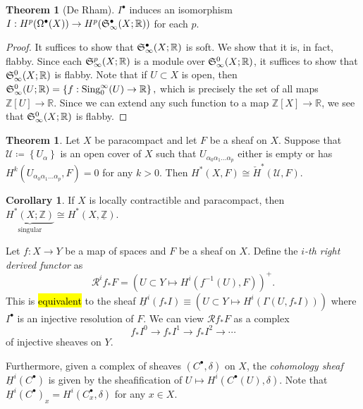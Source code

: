 \documentclass[10pt,letterpaper,cm]{nupset}
\theoremstyle{definition}
\theoremstyle{theorem}
\newtheorem{theorem}[definition]{Theorem}
\newtheorem{corollary}[definition]{Corollary}
\theoremstyle{remark}
\newcommand{\R}{\mathbb{R}}
\newcommand{\Z}{\mathbb Z}
\newcommand{\1}{\mathbb{1}}
\newcommand{\0}{\vec 0}
\DeclareMathOperator{\sing}{Sing}
\begin{document}
\begin{theorem}[De Rham]
$I^{\bullet}$ induces an isomorphism $I: H^{p}(\Omega^{\bullet}(X)) \to H^{p}(\frak{S}_{\infty}^{\bullet}(X; \R))$ for each $p$.
\end{theorem}
\begin{proof}
It suffices to show that $\frak{S}^{\bullet}_{\infty}(X; \R)$ is soft. We show that it is, in fact, flabby. Since each $\frak{S}^p_{\infty}(X; \R)$ is a module over $\frak{S}^0_{\infty}(X; \R)$, it suffices to show that $\frak{S}^0_{\infty}(X; \R)$ is flabby. Note that if $U \subset X$ is open, then  $\frak{S}^0_{\infty}(U; \R) = \left\{f : \sing_0^{\infty}(U) \to \R   \right\},$ which is precisely the set of all  maps $\Z[U] \to \R$. Since we can extend any such function to a map $\Z[X] \to \R$, we see that $\frak{S}^0_{\infty}(X; \R)$ is flabby. 
\end{proof}

\begin{theorem}
Let $X$ be paracompact and let $F$ be a sheaf on $X$. Suppose that $\mathcal{U} \coloneqq \left\{U_{\alpha}\right\}$ is an open cover of $X$ such that $U_{\alpha_0\alpha_1\ldots \alpha_p}$ either is empty or has $H^k(U_{\alpha_0\alpha_1\ldots \alpha_p}, F) =0$ for any $k>0$. Then $H^{\ast}(X, F) \cong \check{H}^{\ast}(\mathcal{U}, F)$.
\end{theorem}

\begin{corollary}
If $X$ is locally contractible and paracompact, then $\underbrace{H^{\ast}(X; \Z)}_{\text{singular}} \cong H^{\ast}(X, \underline{\Z})$.
\end{corollary}

\medskip


Let $f : X \to Y$ be a map of spaces and $F$ be a sheaf on $X$. Define the \textit{$i$-th right derived functor} as $$\mathcal{R}^i{f_{\ast}{F}} = \left( U\subset Y \mapsto H^i(f^{-1}(U), F)  \right)^+.$$ This is \hl{equivalent} to the sheaf $\underline{H}^i(f_{\ast}{I})\equiv (U\subset Y \mapsto H^i(\Gamma(U, f_{\ast}I)))$ where $I^{\bullet}$ is an injective resolution of $F$. We can view $\mathcal{R}f_{\ast}F$ as a complex $$f_{\ast}I^0 \to f_{\ast}I^1 \to f_{\ast}I^2 \to \cdots$$ of injective sheaves on $Y$.

Furthermore, given a complex of sheaves $\left(C^{\bullet}, \delta\right)$ on $X$, the \textit{cohomology sheaf $\underline{H}^i(C^{\bullet})  $} is given by the sheafification of $U \mapsto H^i(C^{\bullet}(U), \delta)$. Note that $\underline{H}^i(C^{\bullet})_x = H^i(C^{\bullet}_x, \delta)$ for any $x\in X$.
\end{document}
